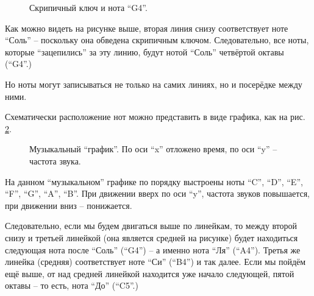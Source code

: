 \documentclass[../sparc.tex]{subfiles}
\begin{document}
\begin{figure}[ht]
  \centering
  \label{fig:lilypond-clef-example}
  \caption{Скрипичный ключ и нота ``G4''.}
\end{figure}

Как можно видеть на рисунке выше, вторая линия снизу соответствует ноте ``Соль''
-- поскольку она обведена скрипичным ключом. Следовательно, все ноты, которые
``зацепились'' за эту линию, будут нотой ``Соль'' четвёртой октавы (``G4''.)

Но ноты могут записываться не только на самих линиях, но и посерёдке между ними.

Схематически расположение нот можно представить в виде графика, как на
рис. \ref{fig:lilypond-music-graph-1}.

\begin{figure}[ht]
  \centering
  \label{fig:lilypond-music-graph-1}
  \caption{Музыкальный ``график''.  По оси ``x'' отложено время, по оси ``y'' --
    частота звука.}
\end{figure}

На данном ``музыкальном'' графике по порядку выстроены ноты ``C'', ``D'', ``E'',
``F'', ``G'', ``A'', ``B''. При движении вверх по оси ``y'', частота звуков
повышается, при движении вниз -- понижается.

Следовательно, если мы будем двигаться выше по линейкам, то между второй снизу и
третьей линейкой (она является средней на рисунке) будет находиться следующая
нота после ``Соль'' (``G4'') -- а именно нота ``Ля'' (``A4''). Третья же линейка
(средняя) соответствует ноте ``Си'' (``B4'') и так далее. Если мы пойдём ещё
выше, от над средней линейкой находится уже начало следующей, пятой октавы -- то
есть, нота ``До'' (``C5''.)
\end{document}
